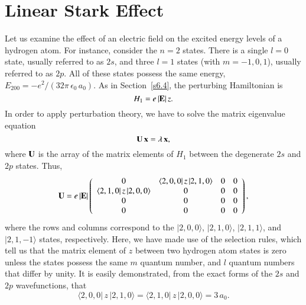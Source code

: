 \section{Linear Stark Effect}\label{s6.6}
Let us examine the effect of an electric field on the excited  energy
levels of a hydrogen atom. For instance, consider the $n=2$ states. 
There is a single $l=0$ state, usually referred to as $2s$, and three $l=1$
states (with $m=-1,0,1$), usually referred to as $2p$. All of these states
possess the same energy, $E_{200} = -e^2/(32\pi\,\epsilon_0 \,a_0)$. As in Section~\ref{s6.4}, the
perturbing Hamiltonian is 
\begin{equation}
H_1 = e \,|{\bf E}| \,z.
\end{equation}
In order to apply  perturbation theory, we have to solve
the matrix eigenvalue equation
\begin{equation}
{\bf U} \,{\bf x} = \lambda\,{\bf x},
\end{equation}
where ${\bf U}$ is the array of the matrix elements of $H_1$ between the
degenerate  $2s$ and
$2p$ states. Thus,
\begin{equation}
{\bf U} = e \,|{\bf E}| \left(
\begin{array}{cccc}
0&\langle 2,0,0|\,z\,|2,1,0\rangle & 0&0\\
\langle 2,1,0|\,z\,|2,0,0\rangle&0&0&0\\
0&0&0&0\\
0&0&0&0
\end{array}\right),
\end{equation}
where the rows and columns correspond to the $|2,0,0\rangle$, $|2,1,0\rangle$,
$|2,1,1\rangle$, and $|2,1,-1\rangle$ states, respectively. Here, we have made use
of the selection rules, which tell us that the matrix element of $z$ between
two hydrogen atom states  is zero unless the states 
possess the same $m$ quantum number, 
and $l$ quantum numbers that differ by unity. It is easily demonstrated,
from the exact forms of the $2s$ and $2p$ wavefunctions, that
\begin{equation}
\langle 2,0,0|\,z\,|2,1,0\rangle = \langle 2,1,0|\,z\,|2,0,0\rangle = 3\,a_0.
\end{equation}

